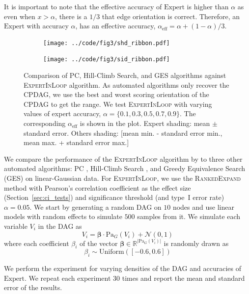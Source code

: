\documentclass[accepted]{uai2025} %
\begin{document}
It is important to note that the effective accuracy of $ \mathrm{Expert} $ is
higher than $ \alpha $ as even when $ x > \alpha $, there is a $ 1/3 $
that edge orientation is correct. Therefore, an $ \mathrm{Expert} $ with
accuracy $ \alpha $, has an effective accuracy, $ \alpha_{\mathrm{eff}} =
\alpha + (1 - \alpha) / 3 $.

\begin{figure}[t!]
	\centering
	\begin{subfigure}{0.5\textwidth}
		\centering
		\texttt{[image: ../code/fig3/shd\_ribbon.pdf]}
		\caption{}
	\end{subfigure}
	\begin{subfigure}{0.5\textwidth}
		\centering
		\texttt{[image: ../code/fig3/sid\_ribbon.pdf]}
		\caption{}
	\end{subfigure}
	\caption{Comparison of PC, Hill-Climb Search, and GES algorithms against
		\textsc{ExpertInLoop} algorithm. As automated algorithms only
		recover the CPDAG, we use the best and worst scoring
		orientation of the CPDAG to get the range. We test
		\textsc{ExpertInLoop} with varying values of expert accuracy, $ \alpha = \{0.1, 0.3, 0.5, 0.7, 0.9\} $. The corresponding
	$\alpha_{\textrm{eff}} $ is shown in the plot. Expert shading: mean $\pm$ standard error. Others shading: [mean min. - standard error min., mean max. + standard error max.]}
	\label{fig:shd_sid}
\end{figure}

We compare the performance of the \textsc{ExpertInLoop} algorithm by
to three other automated algorithms: PC \citep{Spirtes2001,KalischB07}, 
Hill-Climb Search \citep{scutari2010}, and Greedy Equivalence Search (GES) \citep{Chickering2002}
on linear-Gaussian data. For \textsc{ExpertInLoop}, we
use the \textsc{RankedExpand} method with Pearson's correlation coefficient as
the effect size (Section~\ref{sec:ci_tests}) and significance threshold
(and type~I error rate) $\alpha=0.05$. We start by generating a random DAG 
on $10$ nodes and use linear models
with random effects to simulate $ 500 $ samples from it. We simulate each
variable $ V_i $ in the DAG as
$$
	V_i = \bm{\beta} \cdot \mathrm{Pa}_G(V_i) + \mathcal{N}(0, 1)
$$
where each coefficient $\beta_i$ of the vector $\bm{\beta} \in \mathbb{R}^{|\mathrm{Pa}_G(V_i)|}$ is randomly drawn as
$$
\beta_i \sim \mathrm{Uniform}([-0.6, 0.6])
$$
 
We perform the experiment for varying densities of the DAG and accuracies of
$\mathrm{Expert}$. We repeat each experiment $ 30 $ times and report the
mean and standard error of the results.
\end{document}
